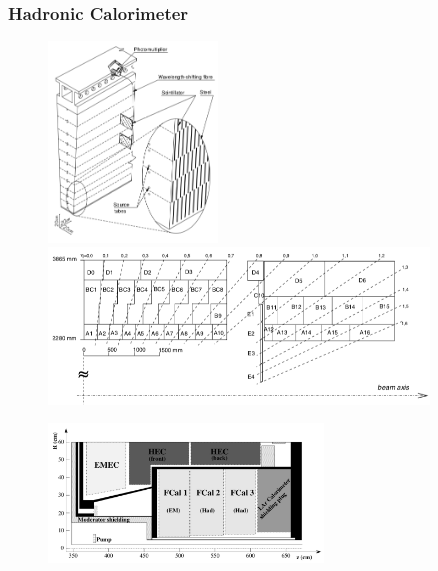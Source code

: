 \FloatBarrier
\subsubsection{Hadronic Calorimeter}
\label{sec:calo_had}

\begin{figure}[!htb]
    \begin{center}
        \includegraphics[width=0.4\textwidth]{figures/chapter2/calorimeters/atlas_tile_module}
        \includegraphics[width=0.9\textwidth]{figures/chapter2/calorimeters/atlas_tile_plan_view}
        \caption{
        }
        \label{fig:tile_calo}
    \end{center}
\end{figure}

\begin{figure}[!htb]
    \begin{center}
        \includegraphics[width=0.65\textwidth]{figures/chapter2/calorimeters/atlas_fcal}
        \caption{
        }
        \label{fig:fcal}
    \end{center}
\end{figure}
